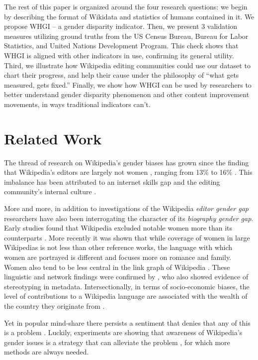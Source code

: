 \documentclass{sig-alternate-05-2015}
\begin{document}
The rest of this paper is organized around the four research questions: we begin by describing the format of Wikidata and statistics of humans contained in it. We propose WHGI – a gender disparity indicator. Then, we present 3 validation measures utilizing ground truths from the US Census Bureau, Bureau for Labor Statistics, and United Nations Development Program. This check shows that WHGI is aligned with other indicators in use, confirming its general utility. Third, we illustrate how Wikipedia editing communities could use our dataset to chart their progress, and help their cause under the philosophy of “what gets measured, gets fixed.” Finally, we show how WHGI can be used by researchers to better understand gender disparity phenomenon and other content improvement movements, in ways traditional indicators can’t.


\section{Related Work}

The thread of research on Wikipedia's gender biases has grown since the finding that Wikipedia's editors are largely not women \cite{glott2010wikipedia} \cite{lam_wp:clubhouse?:_2011}, ranging from 13\% to 16\% \cite{hill_wikipedia_2013}. This imbalance has been attributed to an internet skills gap \cite{hargittai_mind_2015} and the editing community's internal culture \cite{lam_wp:clubhouse?:_2011}. 

More and more, in addition to investigations of the Wikipedia \textit{editor gender gap} researchers have also been interrogating the character of its \textit{biography gender gap}. Early studies found that Wikipedia excluded notable women more than its counterparts \cite{reagle_gender_2011}. More recently \cite{wagner_its_2015} it was shown that while coverage of women in large Wiki\-pedias is not less than other reference works, the language with which women are portrayed is different and focuses more on romance and family. Women also tend to be less central in the link graph of Wikipedia \cite{10.1371/journal.pone.0114825}. These linguistic and network findings were confirmed by \cite{graells-garrido_first_2015}, who also showed evidence of stereotyping in metadata. Intersectionally, in terms of socio-economic biases, the level of contributions to a Wikipedia language are associated with the wealth of the country they originate from \cite{rask_reach_2008}.

Yet in popular mind-share there persists a sentiment that denies that any of this is a problem \cite{eckert_retriggering_2013}. Luckily, experiments are showing that awareness of Wikipedia's gender issues is a strategy that can alleviate the problem \cite{hinnosaar_gender_2015}, for which more methods are always needed.
\end{document}
